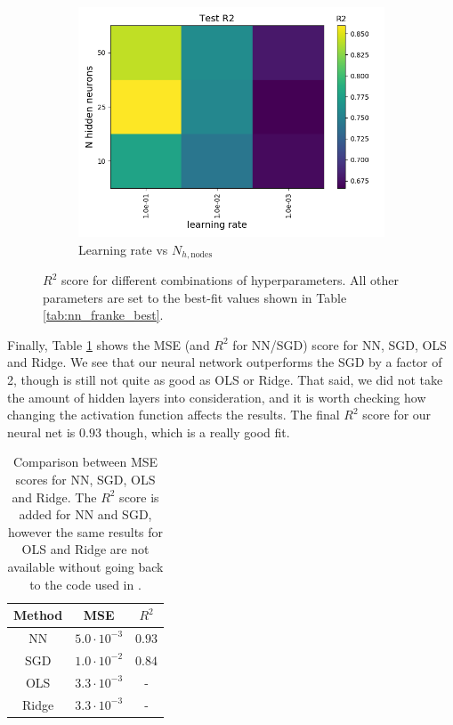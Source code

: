 \documentclass[a4paper]{article}
\newcommand{\Nhn}{N_{h,\text{nodes}}}
\begin{document}
\begin{figure}[H]
    \begin{subfigure}{0.49\textwidth}
    \includegraphics[scale=0.45]{../figures/task_b/test/heatmap_test_lr_constant_Nhyp443431_R2_eta0_nhn.png}
    \caption{Learning rate vs $\Nhn$}
  \end{subfigure}
  \caption{$R^2$ score for different combinations of hyperparameters. All other parameters are set to the best-fit values shown in Table \ref{tab:nn_franke_best}.}
  \label{fig:nn_1}
\end{figure}
Finally, Table \ref{tab:nn_franke_results} shows the MSE (and $R^2$ for NN/SGD) score for NN, SGD, OLS and Ridge. We see that our neural network outperforms the SGD by a factor of 2, though is still not quite as good as OLS or Ridge. That said, we did not take the amount of hidden layers into consideration, and it is worth checking how changing the activation function affects the results. The final $R^2$ score for our neural net is $0.93$ though, which is a really good fit.
\begin{table}[H]
  \centering
	\caption{Comparison between MSE scores for NN, SGD, OLS and Ridge. The $R^2$ score is added for NN and SGD, however the same results for OLS and Ridge are not available without going back to the code used in \cite{Github1}.}
  \label{tab:nn_franke_results}
  \begin{tabular}{c|c|c}
    \hline\hline
    Method & MSE & $R^2$\\\hline
	NN & $5.0\cdot10^{-3}$ & $0.93$ \\
	SGD & $1.0\cdot10^{-2}$& $0.84$ \\
	OLS & $3.3\cdot10^{-3}$& -\\
	Ridge & $3.3\cdot10^{-3}$& -
    \end{tabular}
\end{table}
\end{document}
